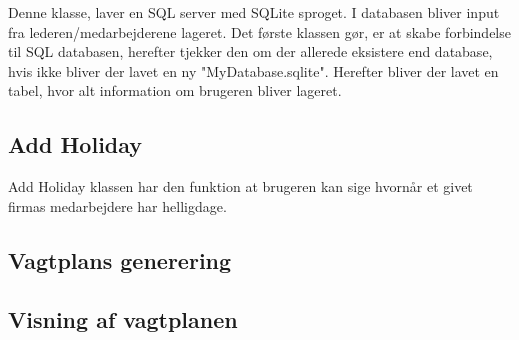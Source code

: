 Denne klasse, laver en SQL server med SQLite sproget. I databasen bliver input fra lederen/medarbejderene lageret. Det første klassen gør, er at skabe forbindelse til SQL databasen, herefter tjekker den om der allerede eksistere end database, hvis ikke bliver der lavet en ny "MyDatabase.sqlite". Herefter bliver der lavet en tabel, hvor alt information om brugeren bliver lageret. 

\subsection{Add Holiday}

Add Holiday klassen har den funktion at brugeren kan sige hvornår et givet firmas medarbejdere har helligdage.

\subsection{Vagtplans generering}

\subsection{Visning af vagtplanen}

\subsection{}